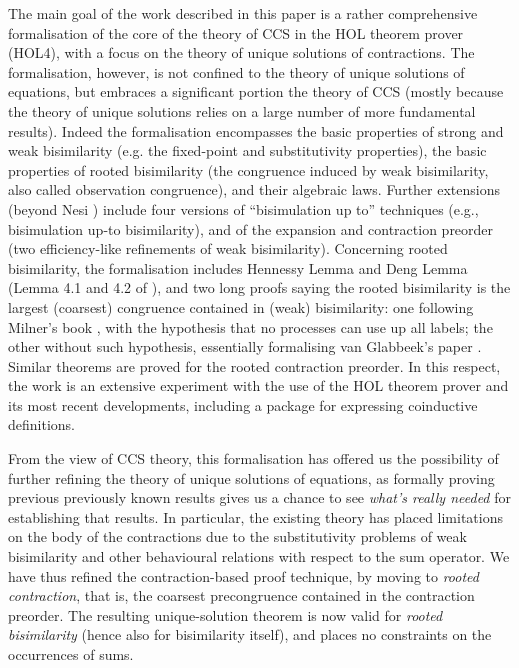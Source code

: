 The main goal of the work described in this paper is a rather
comprehensive formalisation of the core of the theory of CCS in the HOL
theorem prover (HOL4),  with a focus on the theory of unique solutions of contractions.
The formalisation, however, is not confined to the theory of unique
solutions of equations, but embraces a significant portion the theory of CCS \cite{Mil89}
(mostly because the theory of unique solutions relies on a large number of more fundamental results).
Indeed the formalisation encompasses the basic properties of strong and weak
bisimilarity (e.g. the fixed-point and substitutivity properties), the
basic properties of
rooted bisimilarity (the congruence induced by weak
bisimilarity, also called observation congruence), and
their algebraic laws. Further extensions (beyond Nesi
\cite{Nesi:1992ve}) include four versions of ``bisimulation up to''
techniques (e.g., bisimulation up-to bisimilarity), and of the
expansion and contraction preorder (two
efficiency-like refinements of weak bisimilarity). Concerning rooted bisimilarity, the formalisation
includes Hennessy Lemma and Deng Lemma (Lemma 4.1 and 4.2 of
\cite{Gorrieri:2015jt}),
 and two long proofs saying the rooted bisimilarity is the largest (coarsest)
 congruence contained in (weak) bisimilarity: one following Milner's
 book \cite{Mil89}, with the hypothesis that no processes can use up
 all labels;
the other without such hypothesis, essentially formalising van Glabbeek's paper \cite{van2005characterisation}.
Similar theorems are proved for the rooted contraction preorder.
In this respect, the work is an extensive experiment with the use of the HOL theorem prover and its
most recent developments, including a package for expressing coinductive definitions.

From the view of CCS theory, this formalisation has offered us the possibility of
further refining the theory of unique solutions of
equations, as formally proving previous previously known results gives us a
chance to see \emph{what's really needed} for establishing that results.
In particular, the existing theory has placed limitations on the body of the contractions due to the
substitutivity problems of weak bisimilarity and other behavioural relations with respect
to the sum operator.
We have thus refined the contraction-based proof technique, by moving to  
\emph{rooted contraction}, that is, the coarsest precongruence contained in the contraction
preorder. The resulting unique-solution theorem is now valid for
\emph{rooted bisimilarity} (hence also for bisimilarity itself), and places no 
constraints on the occurrences of sums.

